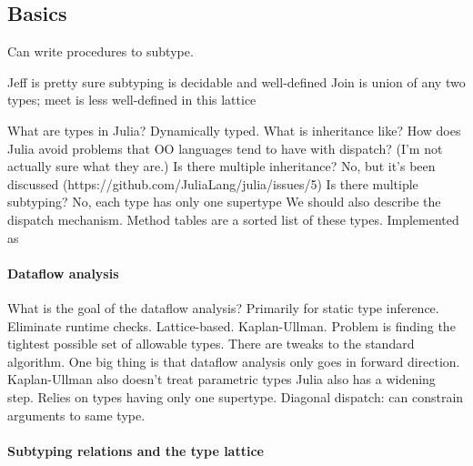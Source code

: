 \subsection{Basics}

Can write procedures to subtype.

Jeff is pretty sure subtyping is decidable and well-defined
Join is union of any two types; meet is less well-defined in this lattice

What are types in Julia?
Dynamically typed.
What is inheritance like?
How does Julia avoid problems that OO languages tend to have with dispatch? (I'm not actually sure what they are.)
Is there multiple inheritance?
No, but it's been discussed (https://github.com/JuliaLang/julia/issues/5)
Is there multiple subtyping?
No, each type has only one supertype
We should also describe the dispatch mechanism.
Method tables are a sorted list of these types.
Implemented as 

\paragraph{Dataflow analysis}

What is the goal of the dataflow analysis? Primarily for static type inference. Eliminate runtime checks. Lattice-based. Kaplan-Ullman.
Problem is finding the tightest possible set of allowable types.
There are tweaks to the standard algorithm. One big thing is that dataflow analysis only goes in forward direction.
Kaplan-Ullman also doesn't treat parametric types
Julia also has a widening step.
Relies on types having only one supertype.
Diagonal dispatch: can constrain arguments to same type.





\paragraph{Subtyping relations and the type lattice}

\paragraph{}

